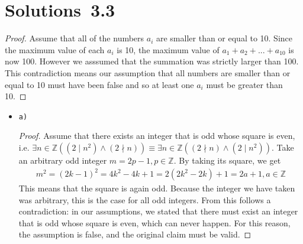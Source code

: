 \section*{Solutions~3.3}%

\begin{solutions}
	
\setcounter{solutioncounter}{0}
\solution
\begin{proof}
	Assume that all of the numbers $a_i$ are smaller than or equal to 10. Since the maximum value of each $a_i$ is 10, the maximum value of $a_1+a_2+...+a_{10}$ is now 100. However we asssumed that the summation was strictly larger than 100. This contradiction means our assumption that all numbers are smaller than or equal to 10 must have been false and so at least one $a_i$ must be greater than 10.
\end{proof}
	
	
\setcounter{solutioncounter}{1}
\solution
\begin{itemize}
	\item \verb|a)|
	\begin{proof}
		Assume that there exists an integer that is odd whose square is even, i.e. $\exists n \in \mathbb{Z} ((2 \mid n^2) \land (2 \nmid n)) \equiv \exists n \in \mathbb{Z} ((2 \nmid n) \land (2 \mid n^2))$. Take an arbitrary odd integer $m = 2p - 1, p \in \mathbb{Z}$. By taking its square, we get
		\begin{align*}
			m^2 = (2k-1)^2
			 = 4k^2 - 4k + 1
			 = 2(2k^2 - 2k) + 1
			 = 2a + 1, a \in \mathbb{Z}
		\end{align*}
		This means that the square is again odd. Because the integer we have taken was arbitrary, this is the case for all odd integers. From this follows a contradiction: in our assumptions, we stated that there must exist an integer that is odd whose square is even, which can never happen. For this reason, the assumption is false, and the original claim must be valid.
	\end{proof}


\end{itemize}
\end{solutions}
